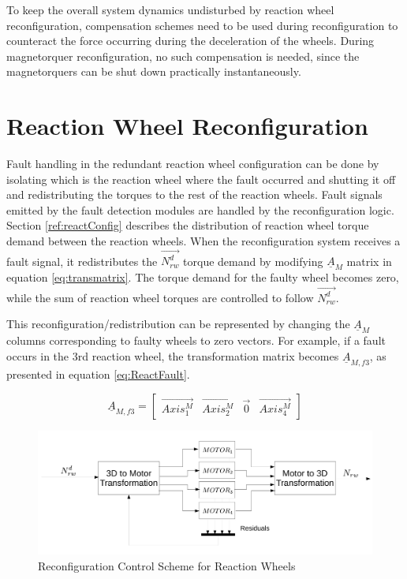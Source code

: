 To keep the overall system dynamics undisturbed by reaction wheel reconfiguration, compensation schemes need to be used during reconfiguration to counteract the force occurring during the deceleration of the wheels. During magnetorquer reconfiguration, no such compensation is needed, since the magnetorquers can be shut down practically instantaneously.
 
\section{Reaction Wheel Reconfiguration}
\label{sec:rwReconfig}
Fault handling in the redundant reaction wheel configuration can be done by isolating which is the reaction wheel where the fault occurred and shutting it off and redistributing the torques to the rest of the reaction wheels. Fault signals emitted by the fault detection modules are handled by the reconfiguration logic. Section \ref{ref:reactConfig} describes the distribution of reaction wheel torque demand between the reaction wheels. When the reconfiguration system receives a fault signal, it redistributes the $\vec{N_{rw}^d}$ torque demand by modifying $\underline{A}_M$ matrix in equation \ref{eq:transmatrix}. The torque demand for the faulty wheel becomes zero, while the sum of reaction wheel torques are controlled to follow $\vec{N_{rw}^d}$.

This reconfiguration/redistribution can be represented by changing the $\underline{A}_M$ columns corresponding to faulty wheels to zero vectors. For example, if a fault occurs in the 3rd reaction wheel, the transformation matrix becomes $\underline{A}_{M,f3}$, as presented in equation \ref{eq:ReactFault}.

\begin{equation}
	\label{eq:ReactFault}
	\underline{A}_{M,f3} = \begin{bmatrix}
		\vec{Axis^{M}_{1}}       & \vec{Axis^{M}_{2}}   & \vec{0}   & \vec{Axis^{M}_{4}} 
	\end{bmatrix} 
\end{equation}

\begin{figure}[H]
	\centering 
	\includegraphics[width=170mm]{figures/reconfig.pdf}	
	\caption{Reconfiguration Control Scheme for Reaction Wheels}
	\label{fig:reconfig}
\end{figure}

